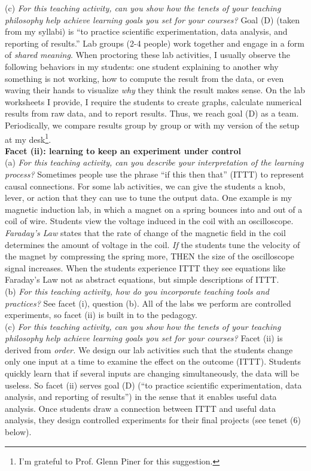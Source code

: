 \documentclass[../../../main.tex]{subfiles}
\begin{document}
(c) \textit{For this teaching activity, can you show how the tenets of your teaching philosophy help achieve learning goals you set for your courses?}  Goal (D) (taken from my syllabi) is ``to practice scientific experimentation, data analysis, and reporting of results.''  Lab groups (2-4 people) work together and engage in a form of \textit{shared meaning}.  When proctoring these lab activities, I usually observe the following behaviors in my students: one student explaining to another why something is not working, how to compute the result from the data, or even waving their hands to visualize \textit{why} they think the result makes sense.  On the lab worksheets I provide, I require the students to create graphs, calculate numerical results from raw data, and to report results.  Thus, we reach goal (D) as a team.  Periodically, we compare results group by group or with my version of the setup at my desk\footnote{I'm grateful to Prof. Glenn Piner for this suggestion.}.
\\
\vspace{0.15cm}
\textbf{Facet (ii): learning to keep an experiment under control}
\\
\vspace{0.15cm}
(a) \textit{For this teaching activity, can you describe your interpretation of the learning process?}  Sometimes people use the phrase ``if this then that'' (ITTT) to represent causal connections.  For some lab activities, we can give the students a knob, lever, or action that they can use to tune the output data.  One example is my magnetic induction lab, in which a magnet on a spring bounces into and out of a coil of wire.  Students view the voltage induced in the coil with an oscilloscope.  \textit{Faraday's Law} states that the rate of change of the magnetic field in the coil determines the amount of voltage in the coil.  \textit{If} the students tune the velocity of the magnet by compressing the spring more, THEN the size of the oscilloscope signal increases.  When the students experience ITTT they see equations like Faraday's Law not as abstract equations, but simple descriptions of ITTT.
\\
\vspace{0.15cm}
(b) \textit{For this teaching activity, how do you incorporate teaching tools and practices?}  See facet (i), question (b).  All of the labs we perform are controlled experiments, so facet (ii) is built in to the pedagogy.
\\
\vspace{0.15cm}
(c) \textit{For this teaching activity, can you show how the tenets of your teaching philosophy help achieve learning goals you set for your courses?}  Facet (ii) is derived from \textit{order.}  We design our lab activities such that the students change only one input at a time to examine the effect on the outcome (ITTT).  Students quickly learn that if several inputs are changing simultaneously, the data will be useless.  So facet (ii) serves goal (D) (``to practice scientific experimentation, data analysis, and reporting of results'') in the sense that it enables useful data analysis.  Once students draw a connection between ITTT and useful data analysis, they design controlled experiments for their final projects (see tenet (6) below).
\end{document}
